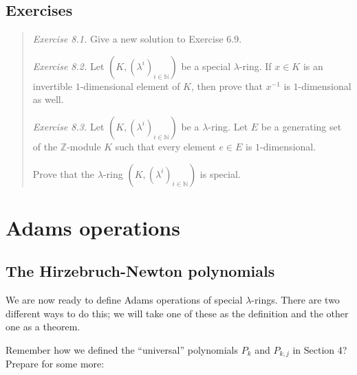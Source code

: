 \documentclass[numbers=enddot,12pt,final,onecolumn,notitlepage]{scrartcl}%
\begin{document}
\subsection{Exercises}

\begin{quotation}
\textit{Exercise 8.1.} Give a new solution to Exercise 6.9.

\textit{Exercise 8.2.} Let $\left(  K,\left(  \lambda^{i}\right)
_{i\in\mathbb{N}}\right)  $ be a special $\lambda$-ring. If $x\in K$ is an
invertible $1$-dimensional element of $K$, then prove that $x^{-1}$ is
$1$-dimensional as well.

\textit{Exercise 8.3.} Let $\left(  K,\left(  \lambda^{i}\right)
_{i\in\mathbb{N}}\right)  $ be a $\lambda$-ring. Let $E$ be a generating set
of the $\mathbb{Z}$-module $K$ such that every element $e\in E$ is $1$-dimensional.

Prove that the $\lambda$-ring $\left(  K,\left(  \lambda^{i}\right)
_{i\in\mathbb{N}}\right)  $ is special.
\end{quotation}

\section{Adams operations}

\subsection{The Hirzebruch-Newton polynomials}

We are now ready to define Adams operations of special $\lambda$-rings. There
are two different ways to do this; we will take one of these as the definition
and the other one as a theorem.

Remember how we defined the ``universal'' polynomials $P_{k}$ and $P_{k,j}$ in
Section 4? Prepare for some more:
\end{document}
